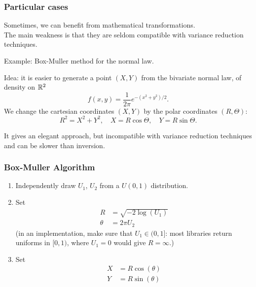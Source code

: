 \documentclass[aspectratio=169]{beamer}
\def\blue{\color{blue}}
\def\red{\color{red}}
\begin{document}
	\begin{frame}
		\frametitle{Particular cases}
		
		Sometimes, we can benefit from mathematical transformations.\\
		The main weakness is that they are seldom compatible with variance
		reduction techniques.
		
		\mbox{}
		
		{\blue Example}: Box-Muller method for the normal law.
		
		\mbox{}
		
		{\red Idea}: it is easier to generate a point $(X, Y)$ from the bivariate
		normal law, of density on $\mathbb{R}^2$
		\[
		f (x, y ) = \frac{1}{2\pi} e^{-(x^2 +y^2 )/2}.
		\]
		We change the cartesian coordinates $(X,Y)$ by the polar coordinates $(R, \Theta)$:\\
		\[
		R^2 = X^2 + Y^2, \quad X = R \cos \Theta, \quad Y = R \sin \Theta.
		\]
		
		It gives an elegant approach, but incompatible with variance reduction techniques and can be slower than inversion.
		
\end{frame}

\begin{frame}
\frametitle{Box-Muller Algorithm}

\begin{enumerate}
\item
Independently draw $U_1$, $U_2$ from a $U(0,1)$ distribution.
\item
Set
\begin{align*}
R &= \sqrt{-2 \log (U_1)} \\
\theta &= 2 \pi U_2
\end{align*}
(in an implementation, make sure that $U_1 \in (0,1]$: most libraries return
uniforms in $[0,1)$, where $U_1 = 0$ would give $R = \infty$.)
\item
Set
\begin{align*}
X &= R \cos(\theta) \\
Y &= R \sin(\theta)
\end{align*}
\end{enumerate}
		
\end{frame}
\end{document}
